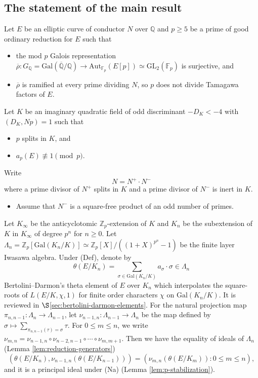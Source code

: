 \documentclass[11pt]{amsart}
\numberwithin{equation}{section}
\theoremstyle{definition}
\begin{document}
\subsection{The statement of the main result}
Let $E$ be an elliptic curve of conductor $N$ over $\mathbb{Q}$ and $p \geq 5$ be a prime of good ordinary reduction for $E$ such that
\begin{itemize}
\item[(Im)]  the mod $p$ Galois representation
$\overline{\rho} : G_{\mathbb{Q}} = \mathrm{Gal}(\overline{\mathbb{Q}}/\mathbb{Q}) \to \mathrm{Aut}_{\mathbb{F}_p}(E[p]) \simeq \mathrm{GL}_2(\mathbb{F}_p)$ is surjective, and
\item[(Ram)] $\overline{\rho}$ is ramified at every prime dividing $N$, so $p$ does not divide Tamagawa factors of $E$.
\end{itemize}
Let $K$ be an imaginary quadratic field of odd discriminant $-D_K  < -4$ with $(D_K, Np) = 1$ such that
\begin{itemize}
\item[(Spl)] $p$ splits in $K$, and
\item[(Na)] $a_p(E) \not\equiv 1 \pmod{p}$.
\end{itemize}
Write 
$$N = N^+ \cdot N^-$$
 where a prime divisor of $N^+$ splits in $K$ and a prime divisor of $N^- $ is inert in $K$.
\begin{itemize}
\item[(Def)] Assume that $N^-$ is a square-free product of an odd number of primes.
\end{itemize}
Let $K_\infty$ be the anticyclotomic $\mathbb{Z}_p$-extension of $K$ and $K_n$ be the subextension of $K$ in $K_\infty$ of degree $p^n$ for $n \geq 0$.
Let $\Lambda_n = \mathbb{Z}_p[\mathrm{Gal}(K_n/K)] \simeq \mathbb{Z}_p[X]/( (1+X)^{p^n} - 1 )$ be the finite layer Iwasawa algebra.
Under (Def), denote by
$$\theta(E/K_n) = \sum_{\sigma \in \mathrm{Gal}(K_n/K)} a_{\sigma} \cdot \sigma \in \Lambda_n$$
 Bertolini--Darmon's theta element of $E$ over $K_n$ which interpolates the square-roots of $L(E/K, \chi, 1)$ for finite order characters $\chi$ on $\mathrm{Gal}(K_n/K)$. It is reviewed in $\S$\ref{sec:bertolini-darmon-elements}.
For the natural projection map $\pi_{n, n-1} : \Lambda_{n} \to \Lambda_{n-1}$, let 
$\nu_{n-1, n} : \Lambda_{n-1} \to \Lambda_n$ be the map defined by $\sigma \mapsto \sum_{\pi_{n, n-1}(\tau) = \sigma} \tau$. For $0 \leq m \leq n$, we write
 $\nu_{m, n} = \nu_{n-1, n} \circ \nu_{n-2, n-1} \circ \cdots \circ \nu_{m, m+1} $.
Then we have the equality of ideals of $\Lambda_n$ (Lemma \ref{lem:reduction-generators})
 $$\left( \theta(E/K_n) , \nu_{n-1, n} \left( \theta(E/K_{n-1}) \right) \right) = \left( \nu_{m, n} \left( \theta(E/K_{m}) \right) : 0 \leq m \leq n \right) ,$$
and it is a principal ideal under (Na) (Lemma \ref{lem:p-stabilization}).
  
\end{document}
